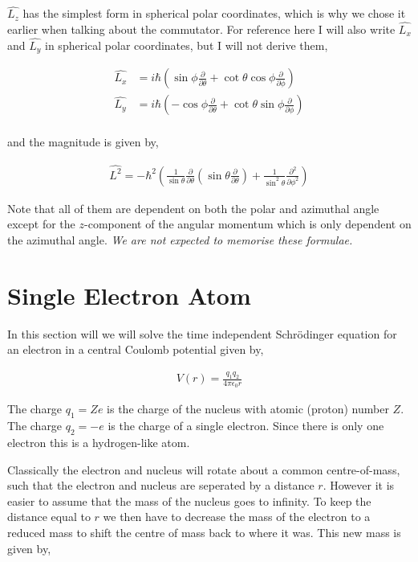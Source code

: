 \documentclass[11pt]{amsart}
\begin{document}
$\hat{L_z}$ has the simplest form in spherical polar coordinates, which is why we chose it earlier when talking about the commutator. For reference here I will also write $\hat{L_x}$ and $\hat{L_y}$ in spherical polar coordinates, but I will not derive them,

\begin{align*}
  \hat{L_x} &= i\hbar\left(\sin{\phi}\frac{\partial}{\partial\theta}+\cot{\theta}\cos{\phi}\frac{\partial}{\partial\phi}\right) \\
  \hat{L_y} &= i\hbar\left(-\cos{\phi}\frac{\partial}{\partial\theta}+\cot{\theta}\sin{\phi}\frac{\partial}{\partial\phi}\right) \\
\end{align*}

and the magnitude is given by,

\begin{align*}
  \hat{L^2} = -\hbar^2\left(\frac{1}{\sin{\theta}}\frac{\partial}{\partial\theta}\left(\sin{\theta}\frac{\partial}{\partial\theta}\right)+\frac{1}{\sin^2{\theta}}\frac{\partial^2}{\partial\phi^2}\right)
\end{align*}

Note that all of them are dependent on both the polar and azimuthal angle except for the $z$-component of the angular momentum which is only dependent on the azimuthal angle. \textit{We are not expected to memorise these formulae.}

\section{Single Electron Atom}

In this section will we will solve the time independent Schr\"{o}dinger equation for an electron in a central Coulomb potential given by,

\begin{align*}
  V(r) = \frac{q_1 q_2}{4\pi\epsilon_0 r}
\end{align*}

The charge $q_1 = Ze$ is the charge of the nucleus with atomic (proton) number $Z$. The charge $q_2 = -e$ is the charge of a single electron. Since there is only one electron this is a hydrogen-like atom.

Classically the electron and nucleus will rotate about a common centre-of-mass, such that the electron and nucleus are seperated by a distance $r$. However it is easier to assume that the mass of the nucleus goes to infinity. To keep the distance equal to $r$ we then have to decrease the mass of the electron to a reduced mass to shift the centre of mass back to where it was. This new mass is given by,
\end{document}
